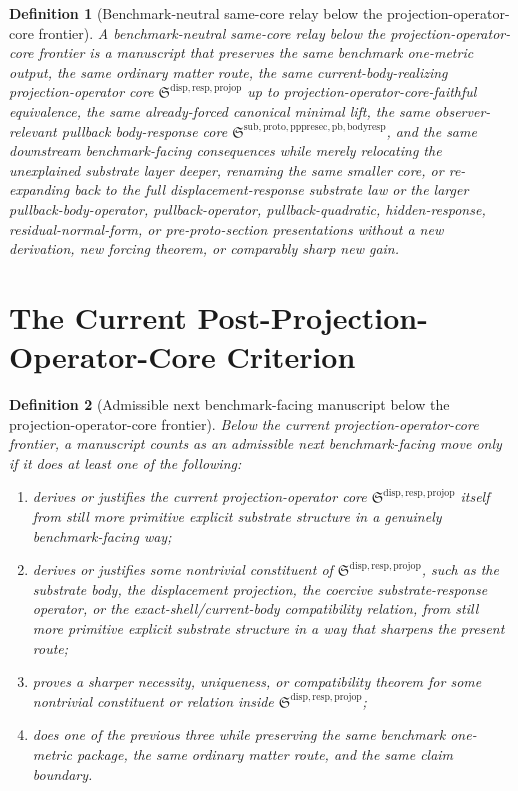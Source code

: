 \documentclass[11pt]{article}
\newcommand{\ProjectionOperatorCore}{\mathfrak S^{\mathrm{disp,resp,projop}}}
\newcommand{\PullbackBodyResponseCore}{\mathfrak S^{\mathrm{sub,proto,pppresec,pb,bodyresp}}}
\newtheorem{definition}{Definition}
\begin{document}
\begin{definition}[Benchmark-neutral same-core relay below the projection-operator-core frontier]
A \emph{benchmark-neutral same-core relay below the projection-operator-core frontier} is a manuscript that preserves the same benchmark one-metric output, the same ordinary matter route, the same current-body-realizing projection-operator core \(\ProjectionOperatorCore\) up to projection-operator-core-faithful equivalence, the same already-forced canonical minimal lift, the same observer-relevant pullback body-response core \(\PullbackBodyResponseCore\), and the same downstream benchmark-facing consequences while merely relocating the unexplained substrate layer deeper, renaming the same smaller core, or re-expanding back to the full displacement-response substrate law or the larger pullback-body-operator, pullback-operator, pullback-quadratic, hidden-response, residual-normal-form, or pre-proto-section presentations without a new derivation, new forcing theorem, or comparably sharp new gain.
\end{definition}

\section{The Current Post-Projection-Operator-Core Criterion}

\begin{definition}[Admissible next benchmark-facing manuscript below the projection-operator-core frontier]
Below the current projection-operator-core frontier, a manuscript counts as an admissible next benchmark-facing move only if it does at least one of the following:
\begin{enumerate}
    \item derives or justifies the current projection-operator core \(\ProjectionOperatorCore\) itself from still more primitive explicit substrate structure in a genuinely benchmark-facing way;
    \item derives or justifies some nontrivial constituent of \(\ProjectionOperatorCore\), such as the substrate body, the displacement projection, the coercive substrate-response operator, or the exact-shell/current-body compatibility relation, from still more primitive explicit substrate structure in a way that sharpens the present route;
    \item proves a sharper necessity, uniqueness, or compatibility theorem for some nontrivial constituent or relation inside \(\ProjectionOperatorCore\);
    \item does one of the previous three while preserving the same benchmark one-metric package, the same ordinary matter route, and the same claim boundary.
\end{enumerate}
\end{definition}
\end{document}

